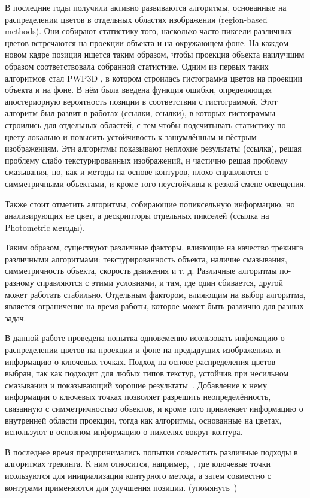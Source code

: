 В последние годы получили активно развиваются алгоритмы, основанные на распределении цветов в отдельных областях изображения (region-based methods). Они собирают статистику того, насколько часто пиксели различных цветов встречаются на проекции объекта и на окружающем фоне. На каждом новом кадре позиция ищется таким образом, чтобы проекция объекта наилучшим образом соответствовала собранной статистике. Одним из первых таких алгоритмов стал PWP3D \cite{PWP3D}, в котором строилась гистограмма цветов на проекции объекта и на фоне. В нём была введена функция ошибки, определяющая апостериорную вероятность позиции в соответствии с гистограммой. Этот алгоритм был развит в работах (ссылки, ссылки), в которых гистограммы строились для отдельных областей, с тем чтобы подсчитывать статистику по цвету локально и повысить устойчивость к зашумлённым и пёстрым изображениям. Эти алгоритмы показывают неплохие результаты (ссылка), решая проблему слабо текстурированных изображений, и частично решая проблему смазывания, но, как и методы на основе контуров, плохо справляются с симметричными объектами, и кроме того неустойчивы к резкой смене освещения. 

Также стоит отметить алгоритмы, собирающие попиксельную информацию, но анализирующих не цвет, а дескрипторы отдельных пикселей (ссылка на Photometric методы).

Таким образом, существуют различные факторы, влияющие на качество трекинга различными алгоритмами: текстурированность объекта, наличие смазывания, симметричность объекта, скорость движения и т. д. Различные алгоритмы по-разному справляются с этими условиями, и там, где один сбивается, другой может работать стабильно. Отдельным фактором, влияющим на выбор алгоритма, является ограничение на время работы, которое может быть различно для разных задач.

В данной работе проведена попытка одновеменно исользовать инфомацию о распределении цветов на проекции и фоне на предыдущих изображениях и информацию о ключевых точках. Подход на основе распределения цветов выбран, так как подходит для любых типов текстур, устойчив при несильном смазывании и показывающий хорошие результаты~\cite{Tjaden2018}. Добавление к нему информации о ключевых точках позволяет разрешить неопределённость, связанную с симметричностью объектов, и кроме того привлекает информацию о внутренней области проекции, тогда как алгоритмы, основанные на цветах, используют в основном информацию о пикселях вокруг контура.

В последнее время предпринимались попытки совместить различные подходы в алгоритмах трекинга. К ним относится, например,~\cite{Bugaev_2018_ECCV}, где ключевые точки исользуются для инициализации контурного метода, а затем совместно с контурами применяются для улучшения позиции. (упомянуть~\cite{ColorFeature2018})

